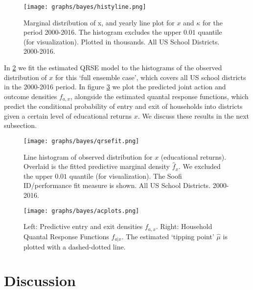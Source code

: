 \begin{table}[htbp]
{\begin{figure}[htb]
\centering
\texttt{[image: graphs/bayes/histyline.png]}
\caption{\label{mdistx2}Marginal distribution of x, and yearly line plot for $x$ and $\kappa$ for the period 2000-2016. The histogram excludes the upper $0.01$ quantile (for visualization). Plotted in thousands. All US School Districts. 2000-2016.}
\end{figure}


In \ref{qrsefit} we fit the estimated QRSE model to the histograms of
the observed distribution of $x$ for this `full ensemble case', which
covers all US school districts in the 2000-2016 period. In figure
\ref{acplots} we plot the predicted joint action and outcome densities
$f_{a,x}$, alongside the estimated quantal response functions, which
predict the conditional probability of entry and exit of households
into districts given a certain level of educational returns $x$. We
discuss these results in the next subsection. 


\begin{figure}[htb]
\centering
\texttt{[image: graphs/bayes/qrsefit.png]}
\caption{\label{qrsefit}Line histogram of observed distribution for $x$ (educational returns). Overlaid is the fitted predictive marginal density $\hat{f}_{x}$. We excluded the upper $0.01$ quantile (for visualization). The Soofi ID/performance fit measure is shown. All US School Districts. 2000-2016.}
\end{figure}


\begin{figure}[htb]
\centering
\texttt{[image: graphs/bayes/acplots.png]}
\caption{\label{acplots}Left: Predictive entry and exit densities $f_{a,x}$. Right: Household Quantal Response Functions $f_{a |x}$. The estimated `tipping point' $\hat{\mu}$ is plotted with a dashed-dotted line.}
\end{figure}



\clearpage

\section{Discussion}
\label{sec-6}

}
\end{table}
